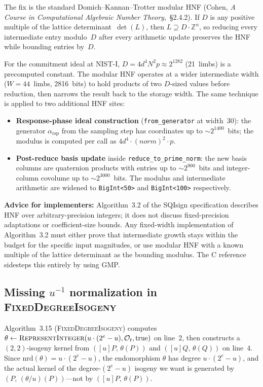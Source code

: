 The fix is the standard Domich--Kannan--Trotter modular HNF
(Cohen, \emph{A Course in Computational Algebraic Number
Theory},~\S2.4.2).  If $D$ is any positive multiple of the
lattice determinant~$\det(L)$, then $L \supseteq D \cdot
\mathbb{Z}^n$, so reducing every intermediate entry modulo~$D$
after every arithmetic update preserves the HNF while bounding
entries by~$D$.

For the commitment ideal at NIST-I, $D = 4 d^4 N^2 p \approx
2^{1282}$ (21~limbs) is a precomputed constant.  The modular HNF
operates at a wider intermediate width ($W = 44$~limbs, 2816~bits)
to hold products of two $D$-sized values before reduction, then
narrows the result back to the storage width.  The same technique
is applied to two additional HNF sites:
\begin{itemize}
  \item \textbf{Response-phase ideal construction}
    (\texttt{from\_generator} at width~30): the generator
    $\alpha_{\mathrm{rsp}}$ from the sampling step has coordinates
    up to ${\sim}2^{1400}$~bits; the modulus is computed per call
    as $4 d^4 \cdot (\mathit{norm})^2 \cdot p$.
  \item \textbf{Post-reduce basis update} inside
    \texttt{reduce\_to\_prime\_norm}: the new basis columns are
    quaternion products with entries up to ${\sim}2^{900}$~bits
    and integer-column covolume up to ${\sim}2^{3000}$~bits.  The
    modulus and intermediate arithmetic are widened to
    \texttt{BigInt<50>} and \texttt{BigInt<100>} respectively.
\end{itemize}

\noindent
\textbf{Advice for implementers:} Algorithm~3.2 of the SQIsign specification
describes HNF over arbitrary-precision integers; it does not
discuss fixed-precision adaptations or coefficient-size bounds.
Any fixed-width implementation of Algorithm~3.2 must either prove
that intermediate growth stays within the budget for the specific
input magnitudes, or use modular HNF with a known multiple of the
lattice determinant as the bounding modulus.  The C reference
sidesteps this entirely by using GMP.

\subsection{Missing $u^{-1}$ normalization in \textsc{FixedDegreeIsogeny}}
\label{sec:bug-u-inv}

Algorithm~3.15 (\textsc{FixedDegreeIsogeny}) computes
$\theta \leftarrow \textsc{RepresentInteger}(u \cdot (2^{e} - u),
\mathcal{O}_t, \mathrm{true})$ on line~2, then constructs a
$(2,2)$-isogeny kernel from $([u]P,\, \theta(P))$ and
$([u]Q,\, \theta(Q))$ on line~4.  Since
$\mathrm{nrd}(\theta) = u \cdot (2^{e} - u)$, the endomorphism
$\theta$ has degree $u \cdot (2^{e} - u)$, and the actual kernel
of the degree-$(2^{e} - u)$ isogeny we want is generated by
$(P,\, (\theta/u)(P))$---not by $([u]P,\, \theta(P))$.

